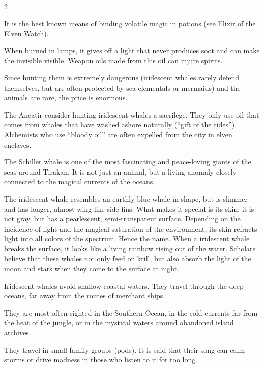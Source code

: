 \begin{multicols}{2}
\begin{denseitemize}
It is the best known means of binding volatile magic in potions (see Elixir of the Elven Watch).

When burned in lamps, it gives off a light that never produces soot and can make the invisible visible. Weapon oils made from this oil can injure spirits.

Since hunting them is extremely dangerous (iridescent whales rarely defend themselves, but are often protected by sea elementals or mermaids) and the animals are rare, the price is enormous.

The Ancatir consider hunting iridescent whales a sacrilege. They only use oil that comes from whales that have washed ashore naturally (“gift of the tides”). Alchemists who use “bloody oil” are often expelled from the city in elven enclaves.

The Schiller whale is one of the most fascinating and peace-loving giants of the seas around Tirakan. It is not just an animal, but a living anomaly closely connected to the magical currents of the oceans.

The iridescent whale resembles an earthly blue whale in shape, but is slimmer and has longer, almost wing-like side fins. What makes it special is its skin: it is not gray, but has a pearlescent, semi-transparent surface.
Depending on the incidence of light and the magical saturation of the environment, its skin refracts light into all colors of the spectrum. Hence the name. When a iridescent whale breaks the surface, it looks like a living rainbow rising out of the water.
Scholars believe that these whales not only feed on krill, but also absorb the light of the moon and stars when they come to the surface at night.

Iridescent whales avoid shallow coastal waters. They travel through the deep oceans, far away from the routes of merchant ships.

They are most often sighted in the Southern Ocean, in the cold currents far from the heat of the jungle, or in the mystical waters around abandoned island archives.

They travel in small family groups (pods). It is said that their song can calm storms or drive madness in those who listen to it for too long. 


\end{denseitemize}
\end{multicols}
